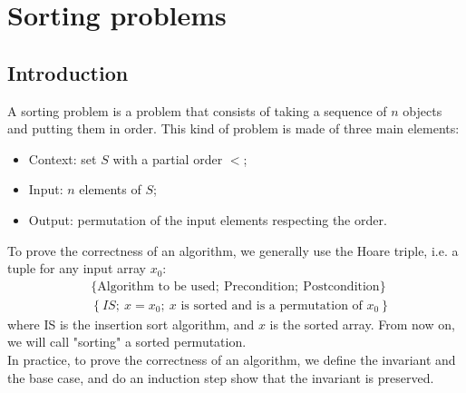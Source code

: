 \documentclass[12pt, openany]{report}
\theoremstyle{definition}
\begin{document}
\section{Sorting problems}
\subsection{Introduction}
A sorting problem is a problem that consists of taking a sequence of $n$ objects and putting them in order. This kind of problem is made of three main elements:
\begin{itemize}
  \item Context: set $S$ with a partial order $<$;
  \item Input: $n$ elements of $S$;
  \item Output: permutation of the input elements respecting the order.
\end{itemize}
To prove the correctness of an algorithm, we generally use the Hoare triple, i.e. a tuple for any input array $x_0$:
\begin{equation}
  \begin{aligned}
	&\{\text{Algorithm to be used};\ \text{Precondition}; \ \text{Postcondition}\}\\
	&\left\{IS;\ x=x_0;\ x\text{ is sorted and is a permutation of }x_0\right\}
\end{aligned}
\end{equation}
where IS is the insertion sort algorithm, and $x$ is the sorted array. From now on, we will call "sorting" a sorted permutation. \\
In practice, to prove the correctness of an algorithm, we define the invariant and the base case, and do an induction step show that the invariant is preserved.\\
\end{document}
